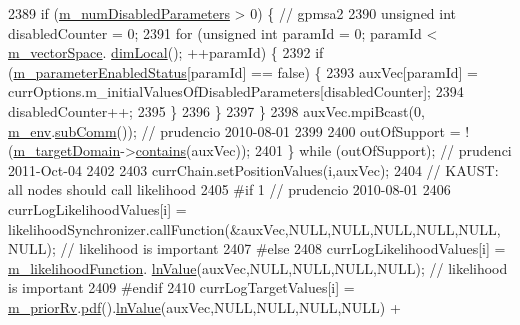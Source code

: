 \begin{DoxyCode}
2389         \textcolor{keywordflow}{if} (\hyperlink{class_q_u_e_s_o_1_1_m_l_sampling_afbe27e6149562020663b72da6592d933}{m\_numDisabledParameters} > 0) \{ \textcolor{comment}{// gpmsa2}
2390           \textcolor{keywordtype}{unsigned} \textcolor{keywordtype}{int} disabledCounter = 0;
2391           \textcolor{keywordflow}{for} (\textcolor{keywordtype}{unsigned} \textcolor{keywordtype}{int} paramId = 0; paramId < \hyperlink{class_q_u_e_s_o_1_1_m_l_sampling_a7bc4c72f65ba9166ed94a6e198b0915b}{m\_vectorSpace}.
      \hyperlink{class_q_u_e_s_o_1_1_vector_space_a5829a1f4f996f8307c840b705144d666}{dimLocal}(); ++paramId) \{
2392             \textcolor{keywordflow}{if} (\hyperlink{class_q_u_e_s_o_1_1_m_l_sampling_ac76690384f70d74b8662faf7a051449e}{m\_parameterEnabledStatus}[paramId] == \textcolor{keyword}{false}) \{
2393               auxVec[paramId] = currOptions.m\_initialValuesOfDisabledParameters[disabledCounter];
2394               disabledCounter++;
2395             \}
2396           \}
2397         \}
2398         auxVec.mpiBcast(0, \hyperlink{class_q_u_e_s_o_1_1_m_l_sampling_a13f1ca4fe9f94822fe572a743eaced1d}{m\_env}.\hyperlink{class_q_u_e_s_o_1_1_base_environment_affe39f53e3d5d678842413370af09145}{subComm}()); \textcolor{comment}{// prudencio 2010-08-01}
2399 
2400         outOfSupport = !(\hyperlink{class_q_u_e_s_o_1_1_m_l_sampling_a21525858e93a7d9654fdf68c8ac25576}{m\_targetDomain}->\hyperlink{class_q_u_e_s_o_1_1_vector_set_ab59fe6ca67647f58920681e05165a9d0}{contains}(auxVec));
2401       \} \textcolor{keywordflow}{while} (outOfSupport); \textcolor{comment}{// prudenci 2011-Oct-04}
2402 
2403       currChain.setPositionValues(i,auxVec);
2404       \textcolor{comment}{// KAUST: all nodes should call likelihood}
2405 \textcolor{preprocessor}{#if 1 // prudencio 2010-08-01}
2406 \textcolor{preprocessor}{}      currLogLikelihoodValues[i] = likelihoodSynchronizer.callFunction(&auxVec,NULL,NULL,NULL,NULL,NULL,
      NULL); \textcolor{comment}{// likelihood is important}
2407 \textcolor{preprocessor}{#else}
2408 \textcolor{preprocessor}{}      currLogLikelihoodValues[i] = \hyperlink{class_q_u_e_s_o_1_1_m_l_sampling_ab08c3059d23460db49b229aa88bd4e70}{m\_likelihoodFunction}.
      \hyperlink{class_q_u_e_s_o_1_1_base_scalar_function_acf2f92adac2df2a0d750dc62cd3a4d0a}{lnValue}(auxVec,NULL,NULL,NULL,NULL); \textcolor{comment}{// likelihood is important}
2409 \textcolor{preprocessor}{#endif}
2410 \textcolor{preprocessor}{}      currLogTargetValues[i]     = \hyperlink{class_q_u_e_s_o_1_1_m_l_sampling_aa45e9c06bd51cae0dc2294af1831c158}{m\_priorRv}.\hyperlink{class_q_u_e_s_o_1_1_base_vector_r_v_a3206740e05e0c64a88273029e963b185}{pdf}().\hyperlink{class_q_u_e_s_o_1_1_base_joint_pdf_aaeb1d91fd791399a502f451b07bb1bfe}{lnValue}(auxVec,NULL,NULL,NULL,NULL) +

\end{DoxyCode}
